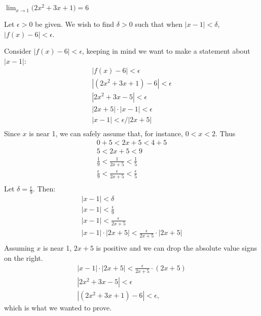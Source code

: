 {$\displaystyle \lim_{x\to 1} \big(2x^2+3x+1\big) = 6$}
{Let $\epsilon >0$ be given. We wish to find $\delta >0$ such that when $|x-1|<\delta$, $|f(x)-6|<\epsilon$. 

Consider $|f(x)-6|<\epsilon$, keeping in  mind we want to make a statement about $|x-1|$:
\begin{gather*}
|f(x) -6 | < \epsilon \\
|(2x^2+3x+1)-6 |<\epsilon \\
| 2x^2+3x-5 | < \epsilon \\
| 2x+5 |\cdot|x-1| < \epsilon \\
| x-1 | < \epsilon/|2x+5| \\
\end{gather*}
Since $x$ is near 1, we can safely assume that, for instance, $0<x<2$. Thus
\begin{gather*}
0+5<2x+5<4+5 \\
5 < 2x+5 < 9 \\
\frac{1}{9} < \frac{1}{2x+5} < \frac{1}{5} \\
\frac{\epsilon}{9} < \frac{\epsilon}{2x+5} < \frac{\epsilon}{5} \\
\end{gather*}
Let $\delta =\frac{\epsilon}{9}$. Then:
\begin{gather*}
|x-1|<\delta \\
|x-1| < \frac{\epsilon}{9}\\
|x-1| < \frac{\epsilon}{2x+5}\\
|x-1|\cdot|2x+5| < \frac{\epsilon}{2x+5}\cdot|2x+5|\\
\end{gather*}
Assuming $x$ is near 1, $2x+5$ is positive and we can drop the absolute value signs on the right.
\begin{gather*}
|x-1|\cdot|2x+5| < \frac{\epsilon}{2x+5}\cdot(2x+5)\\
|2x^2+3x-5| < \epsilon\\
|(2x^2+3x+1) -6| < \epsilon,
\end{gather*}
which is what we wanted to prove.
}


